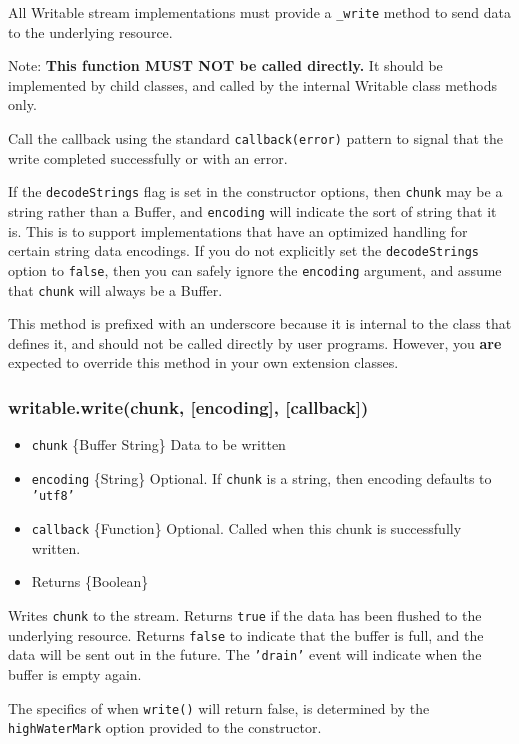All Writable stream implementations must provide a \texttt{\_write}
method to send data to the underlying resource.

Note: \textbf{This function MUST NOT be called directly.} It should be
implemented by child classes, and called by the internal Writable class
methods only.

Call the callback using the standard \texttt{callback(error)} pattern to
signal that the write completed successfully or with an error.

If the \texttt{decodeStrings} flag is set in the constructor options,
then \texttt{chunk} may be a string rather than a Buffer, and
\texttt{encoding} will indicate the sort of string that it is. This is
to support implementations that have an optimized handling for certain
string data encodings. If you do not explicitly set the
\texttt{decodeStrings} option to \texttt{false}, then you can safely
ignore the \texttt{encoding} argument, and assume that \texttt{chunk}
will always be a Buffer.

This method is prefixed with an underscore because it is internal to the
class that defines it, and should not be called directly by user
programs. However, you \textbf{are} expected to override this method in
your own extension classes.

\subsubsection{writable.write(chunk, {[}encoding{]}, {[}callback{]})}

\begin{itemize}
\item
  \texttt{chunk} \{Buffer \textbar{} String\} Data to be written
\item
  \texttt{encoding} \{String\} Optional. If \texttt{chunk} is a string,
  then encoding defaults to \texttt{'utf8'}
\item
  \texttt{callback} \{Function\} Optional. Called when this chunk is
  successfully written.
\item
  Returns \{Boolean\}
\end{itemize}

Writes \texttt{chunk} to the stream. Returns \texttt{true} if the data
has been flushed to the underlying resource. Returns \texttt{false} to
indicate that the buffer is full, and the data will be sent out in the
future. The \texttt{'drain'} event will indicate when the buffer is
empty again.

The specifics of when \texttt{write()} will return false, is determined
by the \texttt{highWaterMark} option provided to the constructor.

